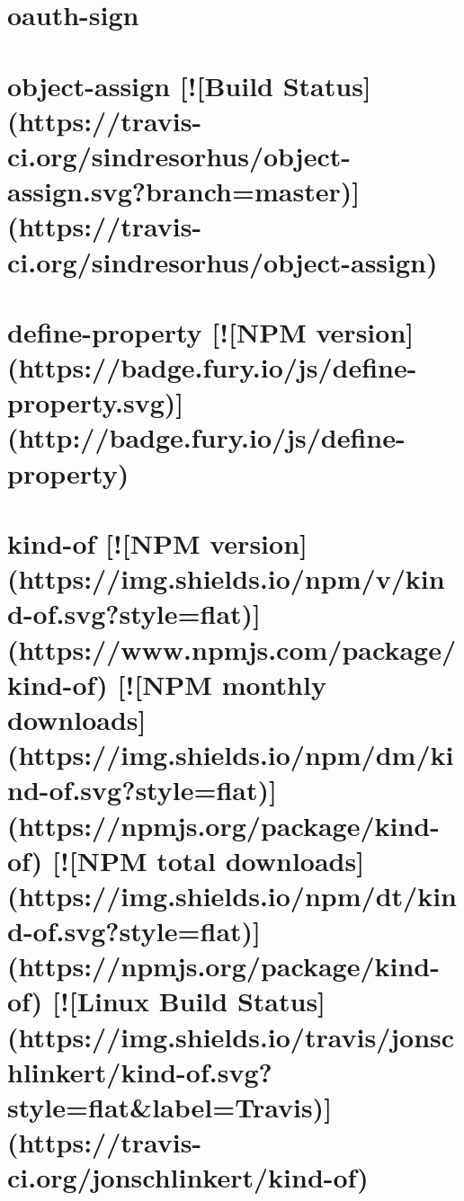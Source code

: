 \documentclass[twoside]{book}
\newcommand{\+}{\discretionary{\mbox{\scriptsize$\hookleftarrow$}}{}{}}
\begin{document}
\chapter{oauth-\/sign}
\label{md_dsmacc_vis_degree_node_modules_oauth-sign_README}

\chapter{object-\/assign \mbox{[}!\mbox{[}Build Status\mbox{]}(https\+://travis-\/ci.org/sindresorhus/object-\/assign.svg?branch=master)\mbox{]}(https\+://travis-\/ci.org/sindresorhus/object-\/assign)}
\label{md_dsmacc_vis_degree_node_modules_object-assign_readme}

\chapter{define-\/property \mbox{[}!\mbox{[}N\+PM version\mbox{]}(https\+://badge.fury.\+io/js/define-\/property.svg)\mbox{]}(http\+://badge.fury.\+io/js/define-\/property)}
\label{md_dsmacc_vis_degree_node_modules_object-copy_node_modules_define-property_README}

\chapter{kind-\/of \mbox{[}!\mbox{[}N\+PM version\mbox{]}(https\+://img.shields.\+io/npm/v/kind-\/of.svg?style=flat)\mbox{]}(https\+://www.npmjs.\+com/package/kind-\/of) \mbox{[}!\mbox{[}N\+PM monthly downloads\mbox{]}(https\+://img.shields.\+io/npm/dm/kind-\/of.svg?style=flat)\mbox{]}(https\+://npmjs.org/package/kind-\/of) \mbox{[}!\mbox{[}N\+PM total downloads\mbox{]}(https\+://img.shields.\+io/npm/dt/kind-\/of.svg?style=flat)\mbox{]}(https\+://npmjs.org/package/kind-\/of) \mbox{[}!\mbox{[}Linux Build Status\mbox{]}(https\+://img.shields.\+io/travis/jonschlinkert/kind-\/of.svg?style=flat\&label=Travis)\mbox{]}(https\+://travis-\/ci.org/jonschlinkert/kind-\/of)}
\label{md_dsmacc_vis_degree_node_modules_object-copy_node_modules_kind-of_README}

\end{document}
